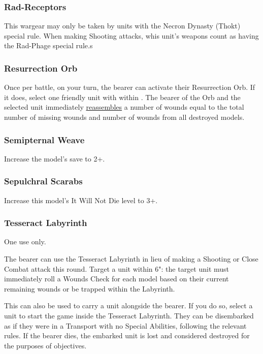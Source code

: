 \subsubsection{Rad-Receptors} \label{Rad Receptors}

This wargear may only be taken by units with the Necron Dynasty (Thokt) special rule. When making Shooting attacks, whis unit's weapons count as having the Rad-Phage special rule.s

\subsubsection{Resurrection Orb} \label{Resurrection Orb}

Once per battle, on your turn, the bearer can activate their Resurrection Orb. If it does, select one friendly unit with  within . The bearer of the Orb and the selected unit immediately \textcolor{violet}{\hyperref[Reanimation Protocols]{reassembles}} a number of wounds equal to the total number of missing wounds and number of wounds from all destroyed models.

\subsubsection{Semipternal Weave} \label{Sempiternal Weave}

Increase the model's save to 2+.

\subsubsection{Sepulchral Scarabs} \label{Sepulchral Scarabs}

Increase this model's It Will Not Die level to 3+.

\subsubsection{Tesseract Labyrinth} \label{Tesseract Labyrinth}

One use only.

The bearer can use the Tesseract Labyrinth in lieu of making a Shooting or Close Combat attack this round. Target a unit within 6": the target unit must immediately roll a Wounds Check for each model based on their current remaining wounds or be trapped within the Labyrinth.

This can also be used to carry a unit alongside the bearer. If you do so, select a unit to start the game inside the Tesseract Labyrinth. They can be disembarked as if they were in a Transport with no Special Abilities, following the relevant rules. If the bearer dies, the embarked unit is lost and considered destroyed for the purposes of objectives.


